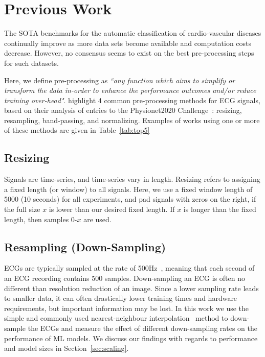 \documentclass[pmlr,twocolumn]{jmlr}%
\begin{document}
\section{Previous Work}
\label{sec:prevwork}
The SOTA benchmarks for the automatic classification of cardio-vascular diseases continually improve as more data sets become available and computation costs decrease. However, no consensus seems to exist on the best pre-processing steps for such datasets. 

Here, we define pre-processing as \textit{``any function which aims to simplify or transform the data in-order to enhance the performance outcomes and/or reduce training over-head"}. \citet{hong2022practical} highlight 4 common pre-processing methods for ECG signals, based on their analysis of entries to the Physionet2020 Challenge~\citep{goldberger2000physiobank,alday2020classification}: resizing, resampling, band-passing, and normalizing. Examples of works using one or more of these methods are given in Table~\ref{tab:top5}

\subsection{Resizing} 
Signals are time-series, and time-series vary in length. Resizing refers to assigning a fixed length (or window) to all signals. Here, we use a fixed window length of 5000 (10 seconds) for all experiments, and pad signals with zeros on the right, if the full size $x$ is lower than our desired fixed length. If $x$ is longer than the fixed length, then samples 0-$x$ are used. 

\subsection{Resampling (Down-Sampling)}
ECGs are typically sampled at the rate of 500Hz~\citep{luo2010review,uwaechia2021comprehensive}, meaning that each second of an ECG recording contains 500 samples. Down-sampling an ECG is often no different than resolution reduction of an image. Since a lower sampling rate leads to smaller data, it can often drastically lower training times and hardware requirements, but important information may be lost. In this work we use the simple and commonly used nearest-neighbour interpolation~\citep{rukundo2012nearest} method to down-sample the ECGs and measure the effect of different down-sampling rates on the performance of ML models. We discuss our findings with regards to performance and model sizes in Section~\ref{sec:scaling}. 
\end{document}

